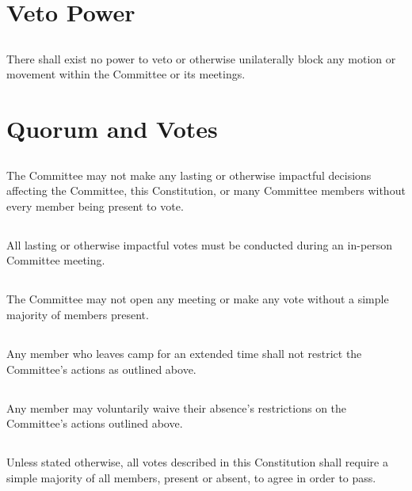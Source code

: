 \documentclass[6pt]{bill}
\begin{document}
	\section{Veto Power}{
		\subsection{}{
			There shall exist no power to veto or otherwise unilaterally block any motion or movement within the Committee or its meetings.
		}
	}
	\section{Quorum and Votes}{
		\subsection{}{
			The Committee may not make any lasting or otherwise impactful decisions affecting the Committee, this Constitution, or many Committee members without every member being present to vote.
		}
		\subsection{}{
			All lasting or otherwise impactful votes must be conducted during an in-person Committee meeting.
		}
		\subsection{}{
			The Committee may not open any meeting or make any vote without a simple majority of members present.
		}
		\subsection{}{
			Any member who leaves camp for an extended time shall not restrict the Committee's actions as outlined above.
		}
		\subsection{}{
			Any member may voluntarily waive their absence's restrictions on the Committee's actions outlined above.
		}
		\subsection{}{
			Unless stated otherwise, all votes described in this Constitution shall require a simple majority of all members, present or absent, to agree in order to pass.
		}
	}
\end{document}
